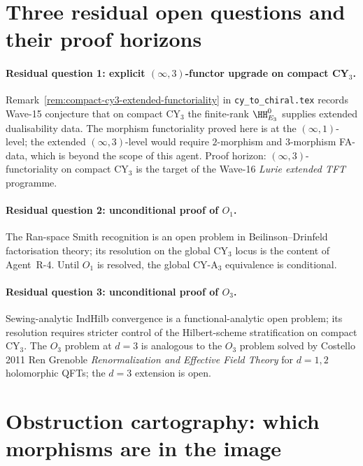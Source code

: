 \section*{Three residual open questions and their proof horizons}

\paragraph{Residual question 1: explicit $(\infty,3)$-functor upgrade on
compact CY$_3$.}  Remark~\ref{rem:compact-cy3-extended-functoriality} in
\texttt{cy\_to\_chiral.tex} records Wave-15 conjecture that on compact
CY$_3$ the finite-rank $\HH^0_{E_3}$ supplies extended dualisability
data.  The morphism functoriality proved here is at the
$(\infty,1)$-level; the extended $(\infty,3)$-level would require
$2$-morphism and $3$-morphism FA-data, which is beyond the scope of
this agent.  Proof horizon: $(\infty,3)$-functoriality on compact CY$_3$
is the target of the Wave-16 \emph{Lurie extended TFT} programme.

\paragraph{Residual question 2: unconditional proof of $O_1$.}  The
Ran-space Smith recognition is an open problem in Beilinson--Drinfeld
factorisation theory; its resolution on the global CY$_3$ locus is the
content of Agent~R-4.  Until $O_1$ is resolved, the global
CY-A$_3$ equivalence is conditional.

\paragraph{Residual question 3: unconditional proof of $O_3$.}
Sewing-analytic IndHilb convergence is a functional-analytic open
problem; its resolution requires stricter control of the Hilbert-scheme
stratification on compact CY$_3$.  The $O_3$ problem at $d = 3$ is
analogous to the $O_3$ problem solved by Costello 2011 Ren Grenoble
\emph{Renormalization and Effective Field Theory} for $d = 1, 2$
holomorphic QFTs; the $d = 3$ extension is open.

\section*{Obstruction cartography: which morphisms are in the image}

